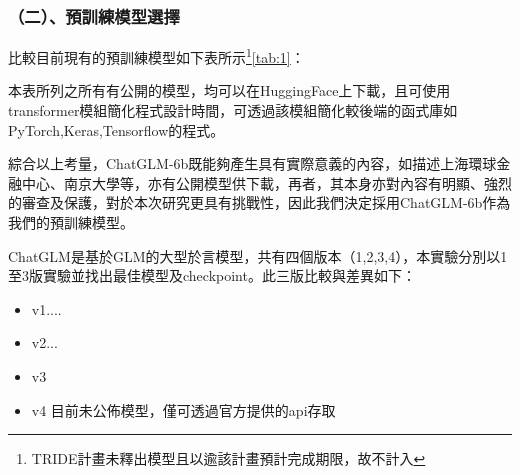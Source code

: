 \documentclass[8pt,a4paper,新細明體,UTF8,natbib]{article}
\begin{document}
\begin{CJK*}{UTF8}{bsmi}
	\subsubsection{（二）、預訓練模型選擇}
	比較目前現有的預訓練模型如下表所示\footnote{TRIDE計畫未釋出模型且以逾該計畫預計完成期限，故不計入}\ref{tab:1}：
	\begin{table}[H]
		\caption{表一、比較及評估預訓練模型}%
		\label{tab:1}
	\end{table}
	本表所列之所有有公開的模型，均可以在HuggingFace上下載，且可使用transformer模組簡化程式設計時間，可透過該模組簡化較後端的函式庫如PyTorch,Keras,Tensorflow的程式。%

	綜合以上考量，ChatGLM-6b既能夠產生具有實際意義的內容，如描述上海環球金融中心、南京大學等，亦有公開模型供下載，再者，其本身亦對內容有明顯、強烈的審查及保護，對於本次研究更具有挑戰性，因此我們決定採用ChatGLM-6b作為我們的預訓練模型。


	ChatGLM是基於GLM的大型於言模型，共有四個版本（1,2,3,4），本實驗分別以1至3版實驗並找出最佳模型及checkpoint。此三版比較與差異如下：
	\begin{itemize}
		\item v1....
		\item v2...
		\item v3
		\item v4 目前未公佈模型，僅可透過官方提供的api存取
	\end{itemize}


\end{CJK*}
\end{document}
